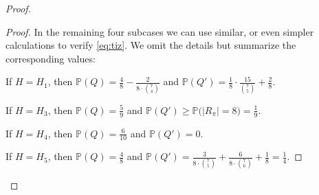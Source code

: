 \documentclass[11pt,a4paper]{article}
\theoremstyle{definition}
\newcommand{\Prob}{\mathbb{P}}
\begin{document}
\begin{proof}
\begin{proof}
        
    In the  remaining four subcases we can use similar, or even simpler calculations to verify \eqref{eq:tiz}. We omit the details but summarize the corresponding values:\medskip
    
    \noindent If $\displaystyle H={{H}}_1$, then 
    $\displaystyle \Prob(Q) = \frac{4}{8}- \frac{2}{8\cdot\binom{7}{4}}$ and 
    $\displaystyle \Prob(Q')=\frac{1}{8}\cdot\frac{15}{\binom{7}{5}}+\frac{2}{8}$.\medskip
    
    
    
    \noindent If $\displaystyle H={{H}}_3$, then 
    $\displaystyle \Prob(Q) = \frac{5}{9}$ and 
    $\displaystyle \Prob(Q') \geq \Prob\big(|R_\pi| = 8\big) = \frac{1}{9}$.\medskip
    
    \noindent If $\displaystyle H={{H}}_4$, then 
    $\displaystyle \Prob(Q) = \frac{6}{10}$ and $\Prob(Q')=0$.	\medskip
    
    \noindent If $\displaystyle H = {{H}}_5$, then 
    $\displaystyle \Prob(Q) = \frac{4}{8}$ and 
    $\displaystyle \Prob(Q') =   \frac{3}{8 \cdot \binom{7}{5}}+\frac{6}{8 \cdot \binom{7}{6}} + \frac{1}{8} = \frac{1}{4}$.
    
    
    
    
    
    

\end{proof}
\end{proof}
\end{document}
